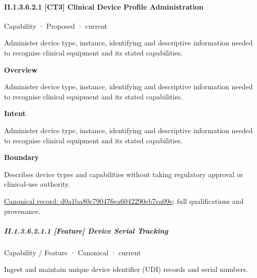 \paragraph*{II.1.3.6.2.1 [CT3] Clinical Device Profile Administration}
\label{navigation:II.1.3.6.2.1}

\label{element:d0a1ba80c790476ea6042290eb7ea09e}
{\small Capability · Proposed · current}\par

Administer device type, instance, identifying and descriptive information needed to recognise clinical equipment and its stated capabilities.



\textbf{Overview}



Administer device type, instance, identifying and descriptive information needed to recognise clinical equipment and its stated capabilities.



\textbf{Intent}



Administer device type, instance, identifying and descriptive information needed to recognise clinical equipment and its stated capabilities.



\textbf{Boundary}



Describes device types and capabilities without taking regulatory approval or clinical-use authority.


{\footnotesize \href{../../../../continuum/strategy/capability/d0a1ba80c790476ea6042290eb7ea09e.md}{Canonical record: d0a1ba80c790476ea6042290eb7ea09e}; full qualifications and provenance.}\par
\subparagraph*{II.1.3.6.2.1.1 [Feature] Device Serial Tracking}
\label{navigation:II.1.3.6.2.1.1}

\label{element:df3dae0cf3044059875dbb888ea6a9ba}
{\small Capability / Feature · Canonical · current}\par

Ingest and maintain unique device identifier (UDI) records and serial numbers.



